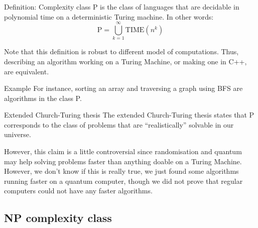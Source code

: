 \documentclass[a4paper]{article}
\begin{document}
\begin{parag}{Definition: Complexity class P}
     is the class of languages that are decidable in polynomial time on a deterministic Turing machine. In other words: 
    \[\text{P} = \bigcup_{k=1}^{\infty} \text{TIME}\left(n^k\right)\]

    Note that this definition is robust to different model of computations. Thus, describing an algorithm working on a Turing Machine, or making one in C++, are equivalent.
    
    \begin{subparag}{Example}
        For instance, sorting an array and traversing a graph using BFS are algorithms in the class P.
    \end{subparag}
    
    \begin{subparag}{Extended Church-Turing thesis}
        The extended Church-Turing thesis states that P corresponds to the class of problems that are ``realistically'' solvable in our universe.

        However, this claim is a little controversial since randomisation and quantum may help solving problems faster than anything doable on a Turing Machine. However, we don't know if this is really true, we just found some algorithms running faster on a quantum computer, though we did not prove that regular computers could not have any faster algorithms.
    \end{subparag}
\end{parag}

\subsection{NP complexity class}
\end{document}
